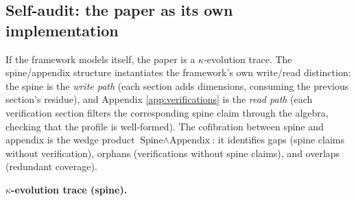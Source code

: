 \subsection{Self-audit: the paper as its own implementation}
\label{sec:self-audit}

If the framework models itself, the paper is a
$\kappa$-evolution trace. The spine/appendix structure
instantiates the framework's own write/read distinction:
the spine is the \emph{write path} (each section adds
dimensions, consuming the previous section's residue),
and Appendix \ref{app:verifications} is the \emph{read
path} (each verification section filters the
corresponding spine claim through the algebra, checking
that the profile is well-formed). The cofibration between
spine and appendix is the wedge product
$\text{Spine} \wedge \text{Appendix}$: it identifies
gaps (spine claims without verification), orphans
(verifications without spine claims), and overlaps
(redundant coverage).

\medskip
\noindent\textbf{$\kappa$-evolution trace (spine).}

